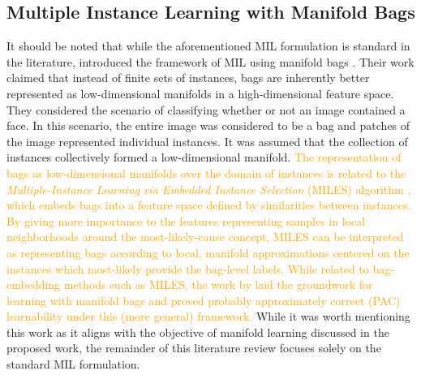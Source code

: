 \noindent

\subsection{Multiple Instance Learning with Manifold Bags}
It should be noted that while the aforementioned MIL formulation is standard in the literature, \cite{Babenko2011MILManifoldBags} introduced the framework of MIL using manifold bags  .  Their work claimed that instead of finite sets of instances, bags are inherently better represented as low-dimensional manifolds in a high-dimensional feature space.  They considered the scenario of classifying whether or not an image contained a face.  In this scenario, the entire image was considered to be a bag and patches of the image represented individual instances.  It was assumed that the collection of instances collectively formed a low-dimensional manifold.  \textcolor{orange}{The representation of bags as low-dimensional manifolds over the domain of instances is related to the \textit{Multiple-Instance Learning via Embedded Instance Selection} (MILES) algorithm \citep{Chen2006MILES}, which embeds bags into a feature space defined by similarities between instances.  By giving more importance to the features representing samples in local neighborhoods around the most-likely-cause concept, MILES can be interpreted as representing bags according to local, manifold approximations centered on the instances which most-likely provide the bag-level labels.  While related to bag-embedding methods such as MILES, the work by \cite{Babenko2011MILManifoldBags} laid the groundwork for learning with manifold bags and proved probably approximately correct (PAC) learnability under this (more general) framework. } While it was worth mentioning this work as it aligns with the objective of manifold learning discussed in the proposed work, the remainder of this literature review focuses solely on the standard MIL formulation.


